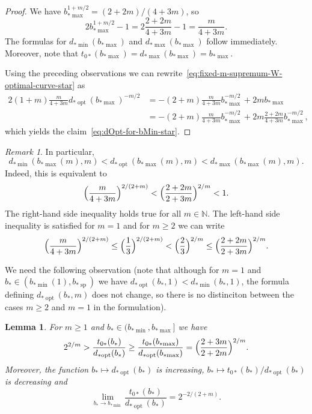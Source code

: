 \documentclass[a4paper]{amsart} %
\newtheorem{lemma}[theorem]{Lemma}
\theoremstyle{definition}
\theoremstyle{remark}
\newtheorem{remark}[theorem]{Remark}
\numberwithin{equation}{section}
\newcommand*{\NN}{\mathbb{N}}
\newcommand*{\bStar}{b_*}
\newcommand*{\tZeroStar}{t_{0*}}
\newcommand*{\bMinStar}{b_{*\!\min}}
\newcommand*{\bMaxStar}{b_{*\!\max}}
\newcommand*{\dMinStar}{d_{*\!\min}}
\newcommand*{\dMaxStar}{d_{*\!\max}}
\newcommand*{\dOptStar}{d_{*\!\operatorname{opt}}}
\newcommand*{\bShStar}{b_{*\!\operatorname{sp}}}
\begin{document}
\begin{proof}
	We have $\bMaxStar^{1+m/2} = (2+2m)/(4+3m)$, so
	\[
	2\bMaxStar^{1+m/2}  - 1 = 2 \frac{2+2m}{4+3m} - 1 = 
	\frac{m}{4+3m}.
	\]
	The formulas for $\dMinStar(\bMaxStar)$ and $\dMaxStar(\bMaxStar)$ follow immediately.
	Moreover, 	note that $\tZeroStar(\bMaxStar) = \dMaxStar(\bMaxStar) = \bMaxStar$.
	
	Using the preceding observations we can rewrite~\eqref{eq:fixed-m-supremum-W-optimal-curve-star}
	as
	\begin{align*}  
	2(1+m)\frac{m}{4+3m} \dOptStar(\bMaxStar)^{-m/2} 
	&= - (2+m) \frac{m}{4+3m} \bMaxStar^{-m/2}   
	+ 2m \bMaxStar\\
	&= - (2+m) \frac{m}{4+3m} \bMaxStar^{-m/2}   
	+ 2m  \frac{2+2m}{4+3m} \bMaxStar^{-m/2}, 
	\end{align*}
	which yields the claim~\eqref{eq:dOpt-for-bMin-star}.
\end{proof}

\begin{remark}	In particular,
	\begin{equation}
	\label{eq:claim-dOpt-for-bMin-star}
	\dMinStar(\bMaxStar(m),m)  < \dOptStar(\bMaxStar(m),m)  < \dMaxStar(\bMaxStar(m),m).
	\end{equation}	
	Indeed, this is equivalent to 
	\[
	\Bigl( \frac{m}{4+3m}\Bigr)^{2/(2+m)} < \Bigl( \frac{2+2m}{2+3m}\Bigr)^{2/m} < 1.
	\]
	The right-hand side inequality holds true for all $m\in \NN$.
	The left-hand side inequality is satisfied for $m=1$ and for $m\geq 2$ we can write
	\[
	\Bigl( \frac{m}{4+3m}\Bigr)^{2/(2+m)}
	\leq 	\Bigl( \frac{1}{3}\Bigr)^{2/(2+m)} < 	\Bigl( \frac{2}{3}\Bigr)^{2/m} \leq  \Bigl( \frac{2+2m}{2+3m}\Bigr)^{2/m}.
	\]
\end{remark}


We need the following observation
(note that although for $m=1$ and $\bStar\in (\bMinStar(1),\bShStar)$ we have
$\dOptStar(\bStar, 1) < \dMinStar(\bStar, 1)$, the
formula defining $\dOptStar(\bStar,m)$ 
does not change,
so there is no distinciton between the cases $m\geq 2$ and $m=1$ in the formulation).

\begin{lemma}
	\label{lem:tZero-divied-by-dOpt-monotone-star}
	For $m\geq 1$ and 
	$\bStar\in (\bMinStar, \bMaxStar]$ we have
	\[
	2^{2/m} > \frac{\tZeroStar(\bStar)}{\dOptStar(\bStar)} \geq \frac{\tZeroStar(\bMaxStar)}{\dOptStar(\bMaxStar)} 
	=
	\Bigl(\frac{2+3m}{2+2m}\Bigr)^{2/m}.
	\]
	Moreover, the function $\bStar\mapsto \dOptStar(\bStar)$ is increasing,  $\bStar\mapsto \tZeroStar(\bStar)/\dOptStar(\bStar)$ is decreasing and  
	\[
	\lim_{\bStar\to\bMinStar}\frac{\tZeroStar(\bStar)}{\dOptStar(\bStar)}
	= 2^{-2/(2+m)}.
	\]
\end{lemma}
\end{document}
